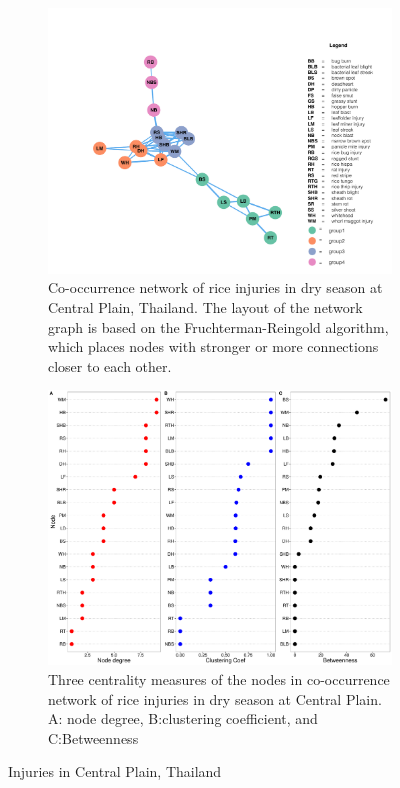 \begin{figure}
    \centering
    \begin{subfigure}[b]{1\textwidth}
        \includegraphics[width = 1\textwidth]{figures/networkCP_ws/networkCP_ws.pdf}
        \caption{Co-occurrence network of rice injuries in dry season at Central Plain, Thailand. The layout of the network graph is based on the Fruchterman-Reingold algorithm, which places nodes with stronger or more connections closer to each other.}
        \label{fig:networkCP_ws}
    \end{subfigure}
    \begin{subfigure}[b]{1\textwidth}
        \includegraphics[width = 1\textwidth]{figures/nodepropCP_ws/nodepropCP_ws.pdf}
        \caption{Three centrality measures of the nodes in co-occurrence network of rice injuries in dry season at Central Plain. A: node degree, B:clustering coefficient, and C:Betweenness}
        \label{fig:nodepropCP_ws}
    \end{subfigure}
    \caption{Injuries in Central Plain, Thailand}
    \label{fig:CP_ws}
\end{figure}

